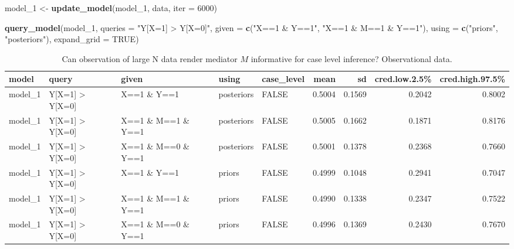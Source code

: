 \documentclass[
  12pt,
]{book}
\newenvironment{Shaded}{\begin{snugshade}}{\end{snugshade}}
\newcommand{\AttributeTok}[1]{\textcolor[rgb]{0.13,0.29,0.53}{#1}}
\newcommand{\ConstantTok}[1]{\textcolor[rgb]{0.56,0.35,0.01}{#1}}
\newcommand{\DecValTok}[1]{\textcolor[rgb]{0.00,0.00,0.81}{#1}}
\newcommand{\FunctionTok}[1]{\textcolor[rgb]{0.13,0.29,0.53}{\textbf{#1}}}
\newcommand{\NormalTok}[1]{#1}
\newcommand{\OtherTok}[1]{\textcolor[rgb]{0.56,0.35,0.01}{#1}}
\newcommand{\StringTok}[1]{\textcolor[rgb]{0.31,0.60,0.02}{#1}}
\begin{document}
\begin{Shaded}
\begin{Highlighting}[]
\NormalTok{model\_1 }\OtherTok{\textless{}{-}} \FunctionTok{update\_model}\NormalTok{(model\_1, data, }\AttributeTok{iter =} \DecValTok{6000}\NormalTok{)}

\FunctionTok{query\_model}\NormalTok{(model\_1, }
            \AttributeTok{queries =} \StringTok{"Y[X=1] \textgreater{} Y[X=0]"}\NormalTok{,}
            \AttributeTok{given =} \FunctionTok{c}\NormalTok{(}\StringTok{"X==1 \& Y==1"}\NormalTok{, }\StringTok{"X==1 \& M==1 \& Y==1"}\NormalTok{),}
            \AttributeTok{using =} \FunctionTok{c}\NormalTok{(}\StringTok{"priors"}\NormalTok{, }\StringTok{"posteriors"}\NormalTok{), }
            \AttributeTok{expand\_grid =} \ConstantTok{TRUE}\NormalTok{)}
\end{Highlighting}
\end{Shaded}

\begin{table}

\caption{\label{tab:unnamed-chunk-110}Can observation of large N data render mediator $M$ informative for case level inference? Observational data.}
\centering
\begin{tabular}[t]{l|l|l|l|l|r|r|r|r}
\hline
model & query & given & using & case\_level & mean & sd & cred.low.2.5\% & cred.high.97.5\%\\
\hline
model\_1 & Y[X=1] > Y[X=0] & X==1 \& Y==1 & posteriors & FALSE & 0.5004 & 0.1569 & 0.2042 & 0.8002\\
\hline
model\_1 & Y[X=1] > Y[X=0] & X==1 \& M==1 \& Y==1 & posteriors & FALSE & 0.5005 & 0.1662 & 0.1871 & 0.8176\\
\hline
model\_1 & Y[X=1] > Y[X=0] & X==1 \& M==0 \& Y==1 & posteriors & FALSE & 0.5001 & 0.1378 & 0.2368 & 0.7660\\
\hline
model\_1 & Y[X=1] > Y[X=0] & X==1 \& Y==1 & priors & FALSE & 0.4999 & 0.1048 & 0.2941 & 0.7047\\
\hline
model\_1 & Y[X=1] > Y[X=0] & X==1 \& M==1 \& Y==1 & priors & FALSE & 0.4990 & 0.1338 & 0.2347 & 0.7522\\
\hline
model\_1 & Y[X=1] > Y[X=0] & X==1 \& M==0 \& Y==1 & priors & FALSE & 0.4996 & 0.1369 & 0.2430 & 0.7670\\
\hline
\end{tabular}
\end{table}
\end{document}
